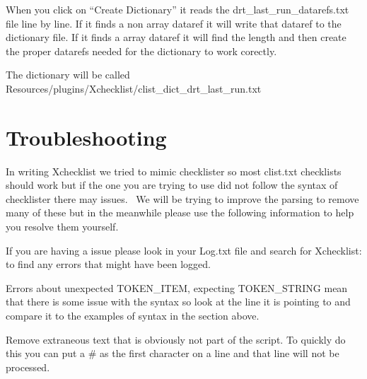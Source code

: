 \documentclass[11pt,parskip=half,a4paper]{scrartcl}
\begin{document}
When you click on ``Create Dictionary'' it reads the drt\_last\_run\_datarefs.txt file line by line. If it finds a non array dataref it will write that dataref to the dictionary file. If it finds a array dataref it will find the length and then create the proper datarefs needed for the dictionary to work corectly. 

The dictionary will be called Resources/plugins/Xchecklist/clist\_dict\_drt\_last\_run.txt

\section{Troubleshooting}

In writing Xchecklist we tried to mimic checklister so most clist.txt checklists should work but if the one you are trying to use did not follow the syntax of checklister there may issues. \ We will be trying to improve the parsing to remove many of these but in the meanwhile please use the following information to help you resolve them yourself. \ 

If you are having a issue please look in your Log.txt file and search for Xchecklist: to find any errors that might have been logged.

Errors about {\textquotedbl}unexpected TOKEN\_ITEM, expecting TOKEN\_STRING{\textquotedbl} mean that there is some issue with the syntax so look at the line it is pointing to and compare it to the examples of syntax in the section above.

Remove extraneous text that is obviously not part of the script. To quickly do this you can put a \# as the first character on a line and that line will not be processed.
\end{document}
